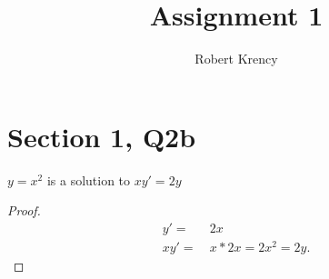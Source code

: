 \documentclass[12pt]{article}
\title{Assignment 1}
\author{Robert Krency}
\date{}
\begin{document}
\maketitle

\section*{Section 1, Q2b}

\(y = x^2\) is a solution to \(xy' = 2y\)
\begin{proof}
  \begin{align*}
    y' = & \ 2x \\
    xy' = & \ x * 2x = 2x^2 = 2y.
  \end{align*}
\end{proof}
\end{document}
